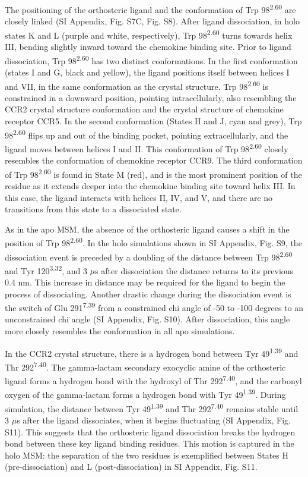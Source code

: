 \documentclass[9pt,twocolumn,twoside]{pnas-new}
\begin{document}
The positioning of the orthosteric ligand and the conformation of Trp 98\textsuperscript{2.60} are closely linked (SI Appendix, Fig. S7C, Fig. S8).
After ligand dissociation, in holo states K and L (purple and white, respectively), Trp 98\textsuperscript{2.60} turns towards helix III, bending slightly inward toward the chemokine binding site.
Prior to ligand dissociation, Trp 98\textsuperscript{2.60} has two distinct conformations.
In the first conformation (states I and G, black and yellow), the ligand positions itself between helices I and VII, in the same conformation as the crystal structure.
Trp 98\textsuperscript{2.60} is constrained in a downward position, pointing intracellularly, also resembling the CCR2 crystal structure conformation and the crystal structure of chemokine receptor CCR5.
In the second conformation (States H and J, cyan and grey), Trp 98\textsuperscript{2.60} flips up and out of the binding pocket, pointing extracellularly, and the ligand moves between helices I and II. This conformation of Trp 98\textsuperscript{2.60} closely resembles the conformation of chemokine receptor CCR9.
The third conformation of Trp 98\textsuperscript{2.60} is found in State M (red), and is the most prominent position of the residue as it extends deeper into the chemokine binding site toward helix III.
In this case, the ligand interacts with helices II, IV, and V, and there are no transitions from this state to a dissociated state.

As in the apo MSM, the absence of the orthosteric ligand causes a shift in the position of Trp 98\textsuperscript{2.60}.
In the holo simulations shown in SI Appendix, Fig. S9, the dissociation event is preceded by a doubling of the distance between Trp 98\textsuperscript{2.60} and Tyr 120\textsuperscript{3.32}, and 3 $\mu$s after dissociation the distance returns to its previous 0.4 nm.
This increase in distance may be required for the ligand to begin the process of dissociating.
Another drastic change during the dissociation event is the switch of Glu 291\textsuperscript{7.39} from a constrained chi angle of -50 to -100 degrees to an unconstrained chi angle (SI Appendix, Fig. S10).
After dissociation, this angle more closely resembles the conformation in all apo simulations.

In the CCR2 crystal structure, there is a hydrogen bond between Tyr 49\textsuperscript{1.39} and Thr 292\textsuperscript{7.40}.
The gamma-lactam secondary exocyclic amine of the orthosteric ligand forms a hydrogen bond with the hydroxyl of Thr 292\textsuperscript{7.40}, and the carbonyl oxygen of the gamma-lactam forms a hydrogen bond with Tyr 49\textsuperscript{1.39}.
During simulation, the distance between Tyr 49\textsuperscript{1.39} and Thr 292\textsuperscript{7.40} remains stable until 3 $\mu$s after the ligand dissociates, when it begins fluctuating (SI Appendix, Fig. S11).
This suggests that the orthosteric ligand dissociation breaks the hydrogen bond between these key ligand binding residues.
This motion is captured in the holo MSM: the separation of the two residues is exemplified between States H (pre-dissociation) and L (post-dissociation) in SI Appendix, Fig. S11.
\end{document}
